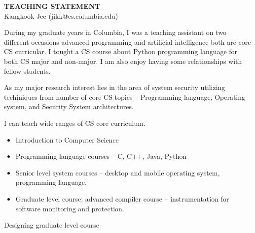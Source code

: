 \documentclass[letterpaper, 10pt]{article}
\begin{document}
\thispagestyle{fancy}

\lhead{}
\rhead{}

\renewcommand{\headrulewidth}{0pt} 
\renewcommand{\footrulewidth}{0pt} 
\fancyfoot[C]{\footnotesize \textcolor{gray}{http://www.cs.columbia.edu/$\sim$jikk/application}} 


\pagestyle{fancy}
\lhead{\textcolor{gray}{\it Kangkook Jee}}
\rhead{\textcolor{gray}{\thepage /\pageref{LastPage}}}

\begin{small}

\begin{center}
{\LARGE \bf TEACHING STATEMENT}\\
\vspace*{0.1cm}
{\normalsize Kangkook Jee (jikk@cs.columbia.edu)}
\end{center}
During my graduate years in Columbia, I was a teaching assistant on two
different occasions advanced programming and artificial intelligence both are
core CS curricular.
%
I tought a CS course about Python programming language for both CS major and
non-major.
%
I am also enjoy having some relationships with fellow students.
%

As my major research interest lies in the area of system security utilizing 
techiniques from number of core CS topics -- Programming language, Operating
system, and Security System architectures.

I can teach wide ranges of CS core curriculum.
\begin{itemize}
\item Introduction to Computer Science
\item Programming language courses -- C, C++, Java, Python 
\item Senior level system courses -- desktop and mobile operating system,
  programming language.
\item Graduate level course: advanced compiler course -- instrumentation for
  software monitoring and protection.
\end{itemize}

Designing graduate level course 

\end{small}
\end{document}

